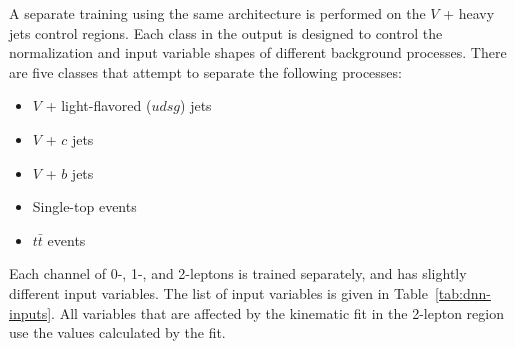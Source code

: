 A separate training using the same architecture is performed on the $V$ + heavy jets control regions.
Each class in the output is designed to control the normalization and input variable shapes
of different background processes.
There are five classes that attempt to separate the following processes:
\begin{itemize}
\item $V$ + light-flavored ($udsg$) jets
\item $V$ + $c$ jets
\item $V$ + $b$ jets
\item Single-top events
\item $t\bar{t}$ events
\end{itemize}

Each channel of 0-, 1-, and 2-leptons is trained separately,
and has slightly different input variables.
The list of input variables is given in Table~\ref{tab:dnn-inputs}.
All variables that are affected by the kinematic fit in the 2-lepton region
use the values calculated by the fit.

